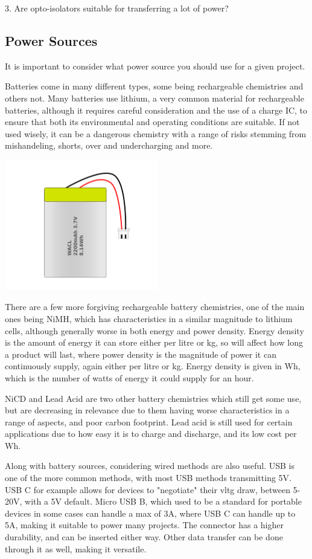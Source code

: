\documentclass[a4paper,11pt]{report}
\begin{document}
3. Are opto-isolators suitable for transferring a lot of power?

\subsection{Power Sources}

It is important to consider what power source you should use for a given project.

Batteries come in many different types, some being rechargeable chemistries and others not. Many batteries use lithium, a very common material for rechargeable batteries, although it requires careful consideration and the use of a charge IC, to ensure that both its environmental and operating conditions are suitable. If not used wisely, it can be a dangerous chemistry with a range of risks stemming from mishandeling, shorts, over and undercharging and more.

\includegraphics[width=0.5\textwidth]{lipobattery}

There are a few more forgiving rechargeable battery chemistries, one of the main ones being NiMH, which has characteristics in a similar magnitude to lithium cells, although generally worse in both energy and power density. Energy density is the amount of energy it can store either per litre or kg, so will affect how long a product will last, where power density is the magnitude of power it can continuously supply, again either per litre or kg. Energy density is given in Wh, which is the number of watts of energy it could supply for an hour.

NiCD and Lead Acid are two other battery chemistries which still get some use, but are decreasing in relevance due to them having worse characteristics in a range of aspects, and poor carbon footprint. Lead acid is still used for certain applications due to how easy it is to charge and discharge, and its low cost per Wh.

Along with battery sources, considering wired methods are also useful. USB is one of the more common methods, with most USB methods transmitting 5V. USB C for example allows for devices to "negotiate" their \gls{vltg} draw, between 5-20V, with a 5V default. Micro USB B, which used to be a standard for portable devices in some cases can handle a max of 3A, where USB C can handle up to 5A, making it suitable to power many projects. The connector has a higher durability, and can be inserted either way. Other data transfer can be done through it as well, making it versatile.
\end{document}
